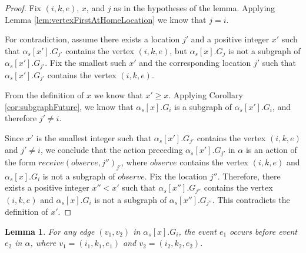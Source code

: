 \documentclass[11pt]{article}
\numberwithin{theorem}{section}
\newtheorem{lemma}[theorem]{Lemma}
\begin{document}
\begin{proof}
Fix $(i,k,e)$, $x$, and $j$ as in the hypotheses of the lemma. Applying Lemma \ref{lem:vertexFirstAtHomeLocation} we know that $j=i$.


For contradiction, assume there exists a location $j'$ and a positive integer $x'$ such that $\alpha_s[x'].G_{j'}$ contains the vertex $(i,k,e)$, but $\alpha_s[x].G_j$ is not a subgraph of $\alpha_s[x'].G_{j'}$. Fix the smallest such $x'$ and the corresponding location $j'$ such that $\alpha_s[x'].G_{j'}$ contains the vertex $(i,k,e)$. 

From the definition of $x$ we know that $x' \geq x$. Applying Corollary \ref{cor:subgraphFuture}, we know that $\alpha_s[x].G_{i}$ is a subgraph of $\alpha_s[x'].G_{i}$, and therefore  $j' \neq i$. 

Since $x'$ is the smallest integer such that $\alpha_s[x'].G_{j'}$ contains the vertex $(i,k,e)$ and $j' \neq i$, we conclude that the action preceding $\alpha_s[x'].G_{j'}$ in $\alpha$ is an action of the form $receive(observe, j'')_{j'}$, where $observe$ contains the vertex $(i,k,e)$ and $\alpha_s[x].G_{i}$ is not a subgraph of $observe$. Fix the location $j''$. Therefore, there exists a positive integer $x'' < x'$ such that $\alpha_s[x''].G_{j''}$ contains the vertex $(i,k,e)$ and $\alpha_s[x].G_{i}$ is not a subgraph of $\alpha_s[x''].G_{j''}$. This contradicts the definition of $x'$.
\end{proof}

\begin{lemma}
\label{lem:edgeHappensBefore}
For any edge $(v_1,v_2)$ in $\alpha_s[x].G_i$, the event $e_1$ occurs
before event $e_2$ in $\alpha$, where $v_1= (i_1,k_1,e_1)$ and $v_2 =
(i_2,k_2,e_2)$.
\end{lemma}
\end{document}

